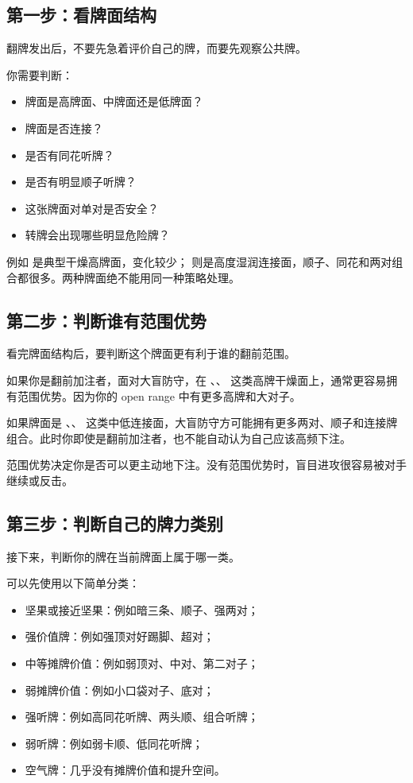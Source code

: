 \subsection{第一步：看牌面结构}

翻牌发出后，不要先急着评价自己的牌，而要先观察公共牌。

你需要判断：

\begin{itemize}
\item 牌面是高牌面、中牌面还是低牌面？
\item 牌面是否连接？
\item 是否有同花听牌？
\item 是否有明显顺子听牌？
\item 这张牌面对单对是否安全？
\item 转牌会出现哪些明显危险牌？
\end{itemize}

例如  是典型干燥高牌面，变化较少； 则是高度湿润连接面，顺子、同花和两对组合都很多。两种牌面绝不能用同一种策略处理。

\subsection{第二步：判断谁有范围优势}

看完牌面结构后，要判断这个牌面更有利于谁的翻前范围。

如果你是翻前加注者，面对大盲防守，在 、、 这类高牌干燥面上，通常更容易拥有范围优势。因为你的 open range 中有更多高牌和大对子。

如果牌面是 、、 这类中低连接面，大盲防守方可能拥有更多两对、顺子和连接牌组合。此时你即使是翻前加注者，也不能自动认为自己应该高频下注。

范围优势决定你是否可以更主动地下注。没有范围优势时，盲目进攻很容易被对手继续或反击。

\subsection{第三步：判断自己的牌力类别}

接下来，判断你的牌在当前牌面上属于哪一类。

可以先使用以下简单分类：

\begin{itemize}
\item 坚果或接近坚果：例如暗三条、顺子、强两对；
\item 强价值牌：例如强顶对好踢脚、超对；
\item 中等摊牌价值：例如弱顶对、中对、第二对子；
\item 弱摊牌价值：例如小口袋对子、底对；
\item 强听牌：例如高同花听牌、两头顺、组合听牌；
\item 弱听牌：例如弱卡顺、低同花听牌；
\item 空气牌：几乎没有摊牌价值和提升空间。
\end{itemize}

